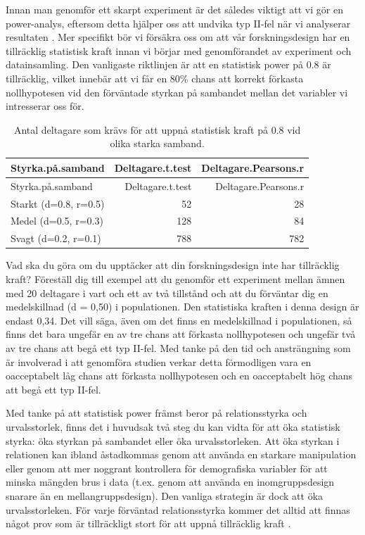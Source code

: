 \documentclass[
]{book}
\begin{document}
Innan man genomför ett skarpt experiment är det således viktigt att vi gör en power-analys, eftersom detta hjälper oss att undvika typ II-fel när vi analyserar resultaten \citep{cohen1992power}. Mer specifikt bör vi försäkra oss om att vår forskningsdesign har en tillräcklig statistisk kraft innan vi börjar med genomförandet av experiment och datainsamling. Den vanligaste riktlinjen är att en statistisk power på 0.8 är tillräcklig, vilket innebär att vi får en 80\% chans att korrekt förkasta nollhypotesen vid den förväntade styrkan på sambandet mellan det variabler vi intresserar oss för.

\begin{longtable}[]{@{}lrr@{}}
\caption{\label{tab:tab-02-07-1-1-01}Antal deltagare som krävs för att uppnå statistisk kraft på 0.8 vid olika starka samband.}\tabularnewline
\toprule
Styrka.på.samband & Deltagare.t.test & Deltagare.Pearsons.r\tabularnewline
\midrule
\endfirsthead
\toprule
Styrka.på.samband & Deltagare.t.test & Deltagare.Pearsons.r\tabularnewline
\midrule
\endhead
Starkt (d=0.8, r=0.5) & 52 & 28\tabularnewline
Medel (d=0.5, r=0.3) & 128 & 84\tabularnewline
Svagt (d=0.2, r=0.1) & 788 & 782\tabularnewline
\bottomrule
\end{longtable}

Vad ska du göra om du upptäcker att din forskningsdesign inte har tillräcklig kraft? Föreställ dig till exempel att du genomför ett experiment mellan ämnen med 20 deltagare i vart och ett av två tillstånd och att du förväntar dig en medelskillnad (d = 0,50) i populationen. Den statistiska kraften i denna design är endast 0,34. Det vill säga, även om det finns en medelskillnad i populationen, så finns det bara ungefär en av tre chans att förkasta nollhypotesen och ungefär två av tre chans att begå ett typ II-fel. Med tanke på den tid och ansträngning som är involverad i att genomföra studien verkar detta förmodligen vara en oacceptabelt låg chans att förkasta nollhypotesen och en oacceptabelt hög chans att begå ett typ II-fel.

Med tanke på att statistisk power främst beror på relationsstyrka och urvalsstorlek, finns det i huvudsak två steg du kan vidta för att öka statistisk styrka: öka styrkan på sambandet eller öka urvalsstorleken. Att öka styrkan i relationen kan ibland åstadkommas genom att använda en starkare manipulation eller genom att mer noggrant kontrollera för demografiska variabler för att minska mängden brus i data (t.ex. genom att använda en inomgruppsdesign snarare än en mellangruppsdesign). Den vanliga strategin är dock att öka urvalsstorleken. För varje förväntad relationsstyrka kommer det alltid att finnas något prov som är tillräckligt stort för att uppnå tillräcklig kraft \citep{faul2007g, faul2009statistical}.
\end{document}
